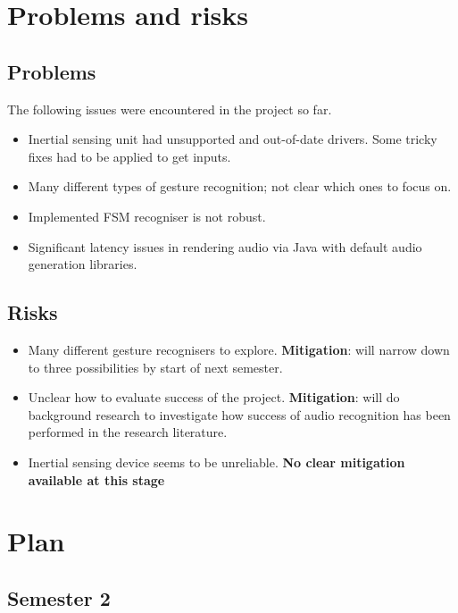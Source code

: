 \documentclass[11pt]{article}
\begin{document}
\section{Problems and risks}\label{problems-and-risks}

\subsection{Problems}\label{problems}

The following issues were encountered in the project so far.
\begin{itemize}
    \tightlist
\item Inertial sensing unit had unsupported and out-of-date drivers. Some tricky
fixes had to be applied to get inputs.
\item Many different types of gesture recognition; not clear which ones to focus
on.
\item Implemented FSM recogniser is not robust.
\item Significant latency issues in rendering audio via Java with default audio
generation libraries.
\end{itemize}

\subsection{Risks}\label{risks}

\begin{itemize}
\tightlist
\item   Many different gesture recognisers to explore. \textbf{Mitigation}: will narrow
down to three possibilities by start of next semester.
\item Unclear how to evaluate success of the project. \textbf{Mitigation}: will do
background research to investigate how success of audio recognition has
been performed in the research literature.
\item Inertial sensing device seems to be unreliable. \textbf{No clear mitigation available at this stage}
\end{itemize}
    
\section{Plan}\label{plan}

\subsection{Semester 2}
\end{document}
